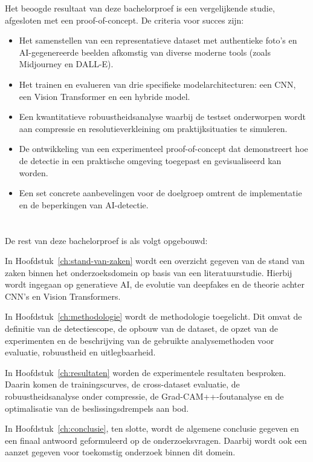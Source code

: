 Het beoogde resultaat van deze bachelorproef is een vergelijkende studie, afgesloten met een proof-of-concept. De criteria voor succes zijn:
\begin{itemize}
    \item Het samenstellen van een representatieve dataset met authentieke foto's en AI-gegenereerde beelden afkomstig van diverse moderne tools (zoals Midjourney en DALL-E).
    \item Het trainen en evalueren van drie specifieke modelarchitecturen: een CNN, een Vision Transformer en een hybride model.
    \item Een kwantitatieve robuustheidsanalyse waarbij de testset onderworpen wordt aan compressie en resolutieverkleining om praktijksituaties te simuleren.
    \item De ontwikkeling van een experimenteel proof-of-concept dat demonstreert hoe de detectie in een praktische omgeving toegepast en gevisualiseerd kan worden.
    \item Een set concrete aanbevelingen voor de doelgroep omtrent de implementatie en de beperkingen van AI-detectie.
\end{itemize}

\section{}%
\label{sec:opzet-bachelorproef}
De rest van deze bachelorproef is als volgt opgebouwd:

In Hoofdstuk~\ref{ch:stand-van-zaken} wordt een overzicht gegeven van de stand van zaken binnen het onderzoeksdomein op basis van een literatuurstudie. Hierbij wordt ingegaan op generatieve AI, de evolutie van deepfakes en de theorie achter CNN's en Vision Transformers.

In Hoofdstuk~\ref{ch:methodologie} wordt de methodologie toegelicht. Dit omvat de definitie van de detectiescope, de opbouw van de dataset, de opzet van de experimenten en de beschrijving van de gebruikte analysemethoden voor evaluatie, robuustheid en uitlegbaarheid.

In Hoofdstuk~\ref{ch:resultaten} worden de experimentele resultaten besproken. Daarin komen de trainingscurves, de cross-dataset evaluatie, de robuustheidsanalyse onder compressie, de Grad-CAM++-foutanalyse en de optimalisatie van de beslissingsdrempels aan bod.

In Hoofdstuk~\ref{ch:conclusie}, ten slotte, wordt de algemene conclusie gegeven en een finaal antwoord geformuleerd op de onderzoeksvragen. Daarbij wordt ook een aanzet gegeven voor toekomstig onderzoek binnen dit domein.